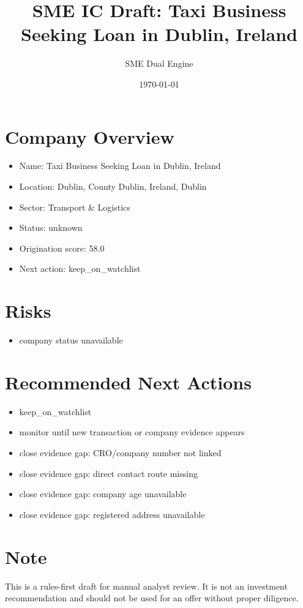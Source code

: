 \documentclass[11pt,a4paper]{article}
\title{SME IC Draft: Taxi Business Seeking Loan in Dublin, Ireland}
\author{SME Dual Engine}
\date{\today}
\begin{document}
\maketitle
\section*{Company Overview}
\begin{itemize}[leftmargin=1.4em]
\item Name: Taxi Business Seeking Loan in Dublin, Ireland
\item Location: Dublin, County Dublin, Ireland, Dublin
\item Sector: Transport \& Logistics
\item Status: unknown
\item Origination score: 58.0
\item Next action: keep\_on\_watchlist
\end{itemize}
\section*{Risks}
\begin{itemize}[leftmargin=1.4em]
\item company status unavailable
\end{itemize}
\section*{Recommended Next Actions}
\begin{itemize}[leftmargin=1.4em]
\item keep\_on\_watchlist
\item monitor until new transaction or company evidence appears
\item close evidence gap: CRO/company number not linked
\item close evidence gap: direct contact route missing
\item close evidence gap: company age unavailable
\item close evidence gap: registered address unavailable
\end{itemize}
\section*{Note}
This is a rules-first draft for manual analyst review. It is not an investment
recommendation and should not be used for an offer without proper diligence.
\end{document}
